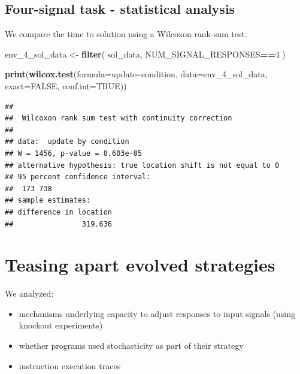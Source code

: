 \documentclass[
]{book}
\newenvironment{Shaded}{\begin{snugshade}}{\end{snugshade}}
\newcommand{\DataTypeTok}[1]{\textcolor[rgb]{0.13,0.29,0.53}{#1}}
\newcommand{\DecValTok}[1]{\textcolor[rgb]{0.00,0.00,0.81}{#1}}
\newcommand{\KeywordTok}[1]{\textcolor[rgb]{0.13,0.29,0.53}{\textbf{#1}}}
\newcommand{\NormalTok}[1]{#1}
\newcommand{\OperatorTok}[1]{\textcolor[rgb]{0.81,0.36,0.00}{\textbf{#1}}}
\newcommand{\OtherTok}[1]{\textcolor[rgb]{0.56,0.35,0.01}{#1}}
\newcommand{\StringTok}[1]{\textcolor[rgb]{0.31,0.60,0.02}{#1}}
\providecommand{\tightlist}{%
  \setlength{\itemsep}{0pt}\setlength{\parskip}{0pt}}
\begin{document}
\hypertarget{four-signal-task---statistical-analysis}{%
\subsection{Four-signal task - statistical analysis}\label{four-signal-task---statistical-analysis}}

We compare the time to solution using a Wilcoxon rank-sum test.

\begin{Shaded}
\begin{Highlighting}[]
\NormalTok{env\_}\DecValTok{4}\NormalTok{\_sol\_data \textless{}{-}}\StringTok{ }\KeywordTok{filter}\NormalTok{(}
\NormalTok{  sol\_data,}
\NormalTok{  NUM\_SIGNAL\_RESPONSES}\OperatorTok{==}\DecValTok{4}
\NormalTok{)}

\KeywordTok{print}\NormalTok{(}\KeywordTok{wilcox.test}\NormalTok{(}\DataTypeTok{formula=}\NormalTok{update}\OperatorTok{\textasciitilde{}}\NormalTok{condition, }\DataTypeTok{data=}\NormalTok{env\_}\DecValTok{4}\NormalTok{\_sol\_data, }\DataTypeTok{exact=}\OtherTok{FALSE}\NormalTok{, }\DataTypeTok{conf.int=}\OtherTok{TRUE}\NormalTok{))}
\end{Highlighting}
\end{Shaded}

\begin{verbatim}
## 
##  Wilcoxon rank sum test with continuity correction
## 
## data:  update by condition
## W = 1456, p-value = 8.603e-05
## alternative hypothesis: true location shift is not equal to 0
## 95 percent confidence interval:
##  173 738
## sample estimates:
## difference in location 
##                319.636
\end{verbatim}

\hypertarget{teasing-apart-evolved-strategies}{%
\section{Teasing apart evolved strategies}\label{teasing-apart-evolved-strategies}}

We analyzed:

\begin{itemize}
\tightlist
\item
  mechanisms underlying capacity to adjust responses to input signals (using knockout experiments)
\item
  whether programs used stochasticity as part of their strategy
\item
  instruction execution traces
\end{itemize}
\end{document}
